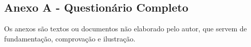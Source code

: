 \begin{anexosenv}

  \partanexos

  \chapter{Anexo A - Questionário Completo}

  Os anexos são textos ou documentos não elaborado pelo autor, que servem de fundamentação, comprovação e ilustração.
\end{anexosenv}
